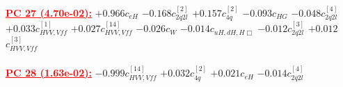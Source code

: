 \documentclass{article}
\begin{document}
\noindent \textcolor{red}{\underline{\bf{PC 27} (4.70e-02):}}
{$+0.966$}{\rm $c_{eH}$} 
{$-0.168$}{\rm $c_{2q2l}^{[2]}$} 
{$+0.157$}{\rm $c_{4q}^{[2]}$} 
{$-0.093$}{\rm $c_{HG}$} 
{$-0.048$}{\rm $c_{2q2l}^{[4]}$} 
{$+0.033$}{\rm $c_{HVV,Vff}^{[1]}$} 
{$+0.027$}{\rm $c_{HVV,Vff}^{[14]}$} 
{$-0.026$}{\rm $c_{W}$} 
{$-0.014$}{\rm $c_{uH,dH,H\Box}$} 
{$-0.012$}{\rm $c_{2q2l}^{[3]}$} 
{$+0.012$}{\rm $c_{HVV,Vff}^{[3]}$} 
 \nonumber \\ \nonumber \\ 
\noindent \textcolor{red}{\underline{\bf{PC 28} (1.63e-02):}}
{$-0.999$}{\rm $c_{HVV,Vff}^{[14]}$} 
{$+0.032$}{\rm $c_{4q}^{[2]}$} 
{$+0.021$}{\rm $c_{eH}$} 
{$-0.014$}{\rm $c_{2q2l}^{[4]}$} 
 \nonumber \\ \nonumber \\ 
\end{document}
